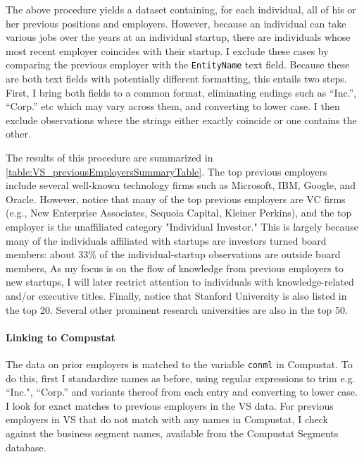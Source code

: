 \documentclass[11pt,english]{article}
\begin{document}
The above procedure yields a dataset containing, for each individual, all of his or her previous positions and employers. However, because an individual can take various jobs over the years at an individual startup, there are individuals whose most recent employer coincides with their startup. I exclude these cases by comparing the previous employer with the \texttt{EntityName} text field. Because these are both text fields with potentially different formatting, this entails two steps. First, I bring both fields to a common format, eliminating endings such as ``Inc.'', ``Corp.'' etc which may vary across them, and converting to lower case. I then exclude observations where the strings either exactly coincide or one contains the other. 

The results of this procedure are summarized in \autoref{table:VS_previousEmployersSummaryTable}. The top previous employers include several well-known technology firms such as Microsoft, IBM, Google, and Oracle. However, notice that many of the top previous employers are VC firms (e.g., New Enterprise Associates, Sequoia Capital, Kleiner Perkins), and the top employer is the unaffiliated category "Individual Investor." This is largely because many of the individuals affiliated with startups are investors turned board members: about 33\% of the individual-startup observations are outside board members, As my focus is on the flow of knowledge from previous employers to new startups, I will later restrict attention to individuals with knowledge-related and/or executive titles. Finally, notice that Stanford University is also listed in the top 20. Several other prominent research universities are also in the top 50. 





\paragraph{Linking to Compustat}

The data on prior employers is matched to the variable \texttt{conml} in Compustat. To do this, first I standardize names as before, using regular expressions to trim e.g. ``Inc.", ``Corp.'' and variants thereof from each entry and converting to lower case. I look for exact matches to previous employers in the VS data. For previous employers in VS that do not match with any names in Compustat, I check against the business segment names, available from the Compustat Segments database. 
\end{document}
